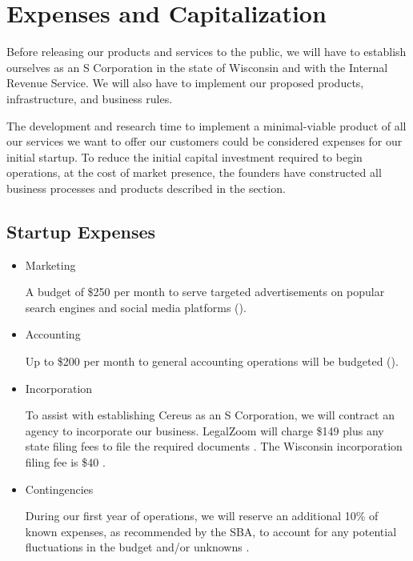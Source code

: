 {\let\cleardoublepage\relax \chapter*{Expenses and Capitalization}}

Before releasing our products and services to the public, we will have to establish ourselves as an S Corporation in the state of Wisconsin and with the Internal Revenue Service. We will also have to implement our proposed products, infrastructure, and business rules.

The development and research time to implement a minimal-viable product of all our services we want to offer our customers could be considered expenses for our initial startup. To reduce the initial capital investment required to begin operations, at the cost of market presence, the founders have constructed all business processes and products described in the  section.

\section{Startup Expenses} \label {startup.exp}

\begin{itemize}

\item Marketing

A budget of \$250 per month to serve targeted advertisements on popular search engines and social media platforms ().

\item Accounting

Up to \$200 per month to general accounting operations will be budgeted (). 

\item Incorporation

To assist with establishing Cereus as an S Corporation, we will contract an agency to incorporate our business. LegalZoom will charge \$149 plus any state filing fees to file the required documents \cite{legalzoom.2020}. The Wisconsin incorporation filing fee is \$40 \cite{wi.2018}.

\item Contingencies

During our first year of operations, we will reserve an additional 10\% of known expenses, as recommended by the SBA, to account for any potential fluctuations in the budget and/or unknowns \cite{sba.2020}.

\end{itemize}

